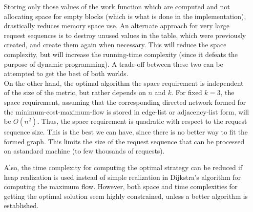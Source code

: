 Storing only those values of the work function which are computed and not allocating space for empty blocks (which is what is done in the implementation), drastically reduces memory space use. An alternate approach for very large request sequences is to destroy unused values in the table, which were previously created, and create them again when necessary. This will reduce the space complexity, but will increase the running-time complexity (since it defeats the purpose of dynamic programming). A trade-off between these two can be attempted to get the best of both worlds. \\

On the other hand, the optimal algorithm the space requirement is independent of the size of the metric, but rather depends on $n$ and $k$. For fixed $k=3$, the space requirement, assuming that the corresponding directed network formed for the minimum-cost-maximum-flow is stored in edge-list or adjacency-list form, will be $O(n^2)$. Thus, the space requirement is quadratic with respect to the request sequence size. This is the best we can have, since there is no better way to fit the formed graph. This limits the size of the request sequence that can be processed on astandard machine (to few thousands of requests).

Also, the time complexity for computing the optimal strategy can be reduced if heap realization is used instead of simple realization in Dijkstra's algorithm for computing the maximum flow. However, both space and time complexities for getting the optimal solution seem highly constrained, unless a better algorithm is established.

